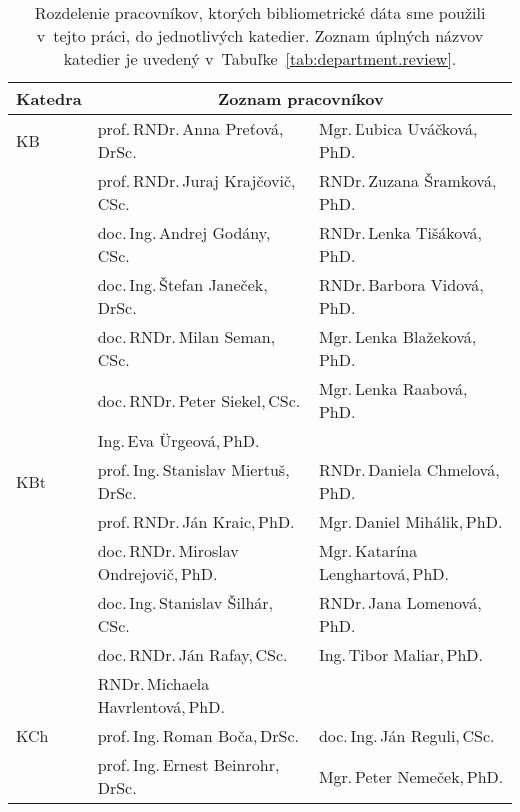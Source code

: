 \begin{table}
  \centering\small
  \caption[Rozdelenie pracovníkov do jednotlivých katedier]%
  {Rozdelenie pracovníkov, ktorých bibliometrické dáta sme použili v~tejto
    práci, do jednotlivých katedier.  Zoznam úplných názvov katedier je uvedený
    v~Tabuľke~\ref{tab:department.review}.}
  \label{tab:staff.list}
  \begin{tabularx}{\textwidth}{lll}
    \toprule
    Katedra & \multicolumn{2}{c}{Zoznam pracovníkov} \\
    \midrule
    KB   & prof.\,RNDr.\,Anna Preťová,\,DrSc.            & Mgr.\,Ľubica Uváčková,\,PhD.         \\
         & prof.\,RNDr.\,Juraj Krajčovič,\,CSc.          & RNDr.\,Zuzana Šramková,\,PhD.        \\
         & doc.\,Ing.\,Andrej Godány,\,CSc.              & RNDr.\,Lenka Tišáková,\,PhD.         \\
         & doc.\,Ing.\,Štefan Janeček,\,DrSc.            & RNDr.\,Barbora Vidová,\,PhD.         \\
         & doc.\,RNDr.\,Milan Seman,\,CSc.               & Mgr.\,Lenka Blažeková,\,PhD.         \\
         & doc.\,RNDr.\,Peter Siekel,\,CSc.              & Mgr.\,Lenka Raabová,\,PhD.           \\
         & Ing.\,Eva Ürgeová,\,PhD.                      &                                      \\[2ex]
    KBt  & prof.\,Ing.\,Stanislav Miertuš,\,DrSc.        & RNDr.\,Daniela Chmelová,\,PhD.       \\
         & prof.\,RNDr.\,Ján Kraic,\,PhD.                & Mgr.\,Daniel Mihálik,\,PhD.          \\
         & doc.\,RNDr.\,Miroslav Ondrejovič,\,PhD.       & Mgr.\,Katarína Lenghartová,\,PhD.    \\
         & doc.\,Ing.\,Stanislav Šilhár,\,CSc.           & RNDr.\,Jana Lomenová,\,PhD.          \\
         & doc.\,RNDr.\,Ján Rafay,\,CSc.                 & Ing.\,Tibor Maliar,\,PhD.            \\
         & RNDr.\,Michaela Havrlentová,\,PhD.            &                                      \\[2ex]
    KCh  & prof.\,Ing.\,Roman Boča,\,DrSc.               & doc.\,Ing.\,Ján Reguli,\,CSc.        \\
         & prof.\,Ing.\,Ernest Beinrohr,\,DrSc.          & Mgr.\,Peter Nemeček,\,PhD.           \\

\end{tabularx}
\end{table}
